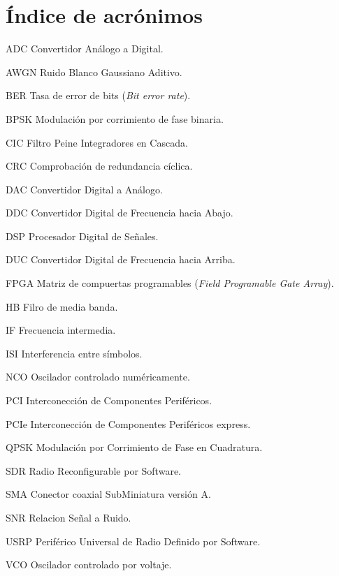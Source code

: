 \chapter*{\'Indice de acr\'onimos}
%

\begin{symbollist*}

\item[ADC]  Convertidor An\'alogo a Digital.
\item[AWGN] Ruido Blanco Gaussiano Aditivo.
\item[BER]  Tasa de error de bits (\emph{Bit error rate}).
\item[BPSK] Modulaci\'on por corrimiento de fase binaria.
\item[CIC]  Filtro Peine Integradores en Cascada.
\item[CRC]  Comprobaci\'on de redundancia c\'iclica.
\item[DAC]  Convertidor Digital a An\'alogo.
\item[DDC]  Convertidor Digital de Frecuencia hacia Abajo.
\item[DSP]  Procesador Digital de Se\~nales.
\item[DUC]  Convertidor Digital de Frecuencia hacia Arriba.
\item[FPGA] Matriz de compuertas programables (\emph{Field Programable Gate Array}).
\item[HB]   Filro de media banda.
\item[IF]   Frecuencia intermedia.
\item[ISI]  Interferencia entre s\'imbolos.
\item[NCO]  Oscilador controlado num\'ericamente.
\item[PCI]  Interconecci\'on de Componentes Perif\'ericos.
\item[PCIe] Interconecci\'on de Componentes Perif\'ericos express.
\item[QPSK] Modulaci\'on por Corrimiento de Fase en Cuadratura.
\item[SDR]  Radio Reconfigurable por Software.
\item[SMA]  Conector coaxial SubMiniatura versi\'on A.
\item[SNR]  Relacion Se\~nal a Ruido.
\item[USRP] Perif\'erico Universal de Radio Definido por Software.
\item[VCO]  Oscilador controlado por voltaje.

\end{symbollist*}